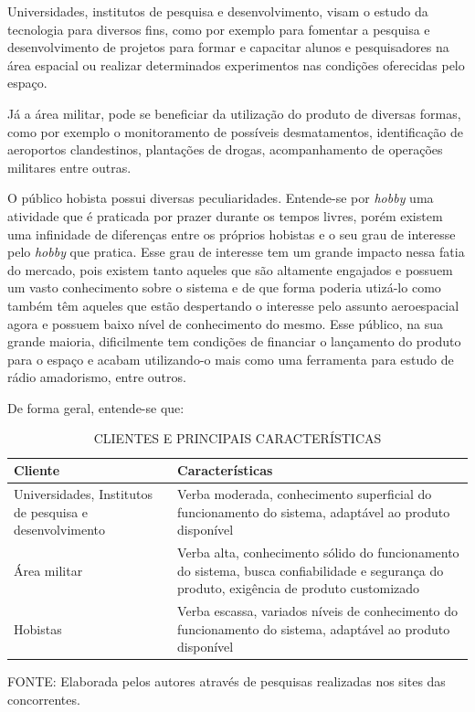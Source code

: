 \documentclass[
	12pt,				%
	openright,			%
	oneside,			%
	a4paper,			%
	english,			%
	french,				%
	spanish,			%
	brazil				%
	]{abntex2}
\begin{document}
	Universidades, institutos de pesquisa e desenvolvimento, visam o estudo da tecnologia para diversos fins, como por exemplo para fomentar a pesquisa e desenvolvimento de projetos para formar e capacitar alunos e pesquisadores na área espacial ou realizar determinados experimentos nas condições oferecidas pelo espaço.
	
	Já a área militar, pode se beneficiar da utilização do produto de diversas formas, como por exemplo o monitoramento de possíveis desmatamentos, identificação de aeroportos clandestinos, plantações de drogas, acompanhamento de operações militares entre outras.
	
	O público hobista possui diversas peculiaridades. Entende-se por \textit{hobby} uma atividade que é praticada por prazer durante os tempos livres, porém existem uma infinidade de diferenças entre os próprios hobistas e o seu grau de interesse pelo \textit{hobby} que pratica. Esse grau de interesse tem um grande impacto nessa fatia do mercado, pois existem tanto aqueles que são altamente engajados e possuem um vasto conhecimento sobre o sistema e de que forma poderia utizá-lo como também têm aqueles que estão despertando o interesse pelo assunto aeroespacial agora e possuem baixo nível de conhecimento do mesmo. Esse público, na sua grande maioria, dificilmente tem condições de financiar o lançamento do produto para o espaço e acabam utilizando-o mais como uma ferramenta para estudo de rádio amadorismo, entre outros.
	
	De forma geral, entende-se que:
	
	\begin{table} [th]
	\caption{CLIENTES E PRINCIPAIS CARACTERÍSTICAS}
	\centering
	\begin{tabular}{p{6cm}|p{6cm}}

		\textbf{Cliente} & \textbf{Características}\\
		\hline
		Universidades, Institutos de pesquisa e desenvolvimento & Verba moderada, conhecimento superficial do funcionamento do sistema, adaptável ao produto disponível\\
		\hline
		Área militar & Verba alta, conhecimento sólido do funcionamento do sistema, busca confiabilidade e segurança do produto, exigência de produto customizado\\
		\hline
		Hobistas & Verba escassa, variados níveis de conhecimento do funcionamento do sistema, adaptável ao produto disponível\\
		\hline
			
	\end{tabular}
	
	\begin{small}
		FONTE: Elaborada pelos autores através de pesquisas realizadas nos sites das concorrentes.
	\end{small}	
	\end{table}		
	
\end{document}
